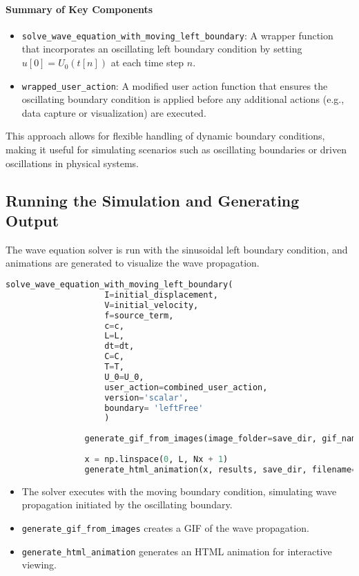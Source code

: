 \documentclass{article}
\begin{document}
			\paragraph{Summary of Key Components} 
			
			\begin{itemize}
				\item \texttt{solve\_wave\_equation\_with\_moving\_left\_boundary}: A wrapper function that incorporates an oscillating left boundary condition by setting \( u[0] = U_0(t[n]) \) at each time step \( n \).
				\item \texttt{wrapped\_user\_action}: A modified user action function that ensures the oscillating boundary condition is applied before any additional actions (e.g., data capture or visualization) are executed.
			\end{itemize}
			This approach allows for flexible handling of dynamic boundary conditions, making it useful for simulating scenarios such as oscillating boundaries or driven oscillations in physical systems.
			
			
			\subsection{Running the Simulation and Generating Output}
			
			The wave equation solver is run with the sinusoidal left boundary condition, and animations are generated to visualize the wave propagation.
			
			\begin{lstlisting}[language=Python]
				solve_wave_equation_with_moving_left_boundary(
					I=initial_displacement,
					V=initial_velocity,
					f=source_term,
					c=c,
					L=L,
					dt=dt,
					C=C,
					T=T,
					U_0=U_0,
					user_action=combined_user_action,
					version='scalar',
					boundary= 'leftFree'
					)
				
				generate_gif_from_images(image_folder=save_dir, gif_name='wave_with_moving_boundary.gif', duration=0.1)
				
				x = np.linspace(0, L, Nx + 1)
				generate_html_animation(x, results, save_dir, filename="wave_with_moving_boundary.html", ymin=-0.6, ymax=0.7)
			\end{lstlisting}
			
			\begin{itemize}
				\item The solver executes with the moving boundary condition, simulating wave propagation initiated by the oscillating boundary.
				\item \texttt{generate\_gif\_from\_images} creates a GIF of the wave propagation.
				\item \texttt{generate\_html\_animation} generates an HTML animation for interactive viewing.
			\end{itemize}
			
\end{document}
